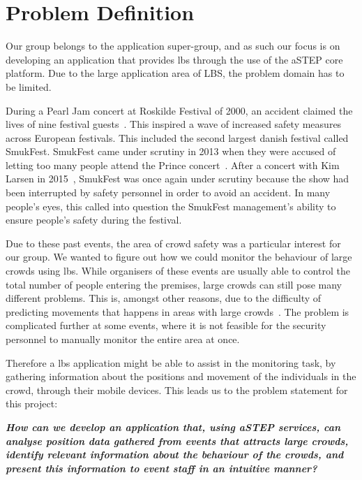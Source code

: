 \section{Problem Definition} \label{sec:problem_def}
Our group belongs to the application super-group, and as such our focus is on developing an application that provides \gls{lbs} through the use of the aSTEP core platform. Due to the large application area of LBS, the problem domain has to be limited.

During a Pearl Jam concert at Roskilde Festival of 2000, an accident claimed the lives of nine festival guests~\cite{roskilde}. This inspired a wave of increased safety measures across European festivals. This included the second largest danish festival called SmukFest. SmukFest came under scrutiny in 2013 when they were accused of letting too many people attend the Prince concert~\cite{smukfestPrince}. After a concert with Kim Larsen in 2015~\cite{kimlarsen}, SmukFest was once again under scrutiny because the show had been interrupted by safety personnel in order to avoid an accident. In many people's eyes, this called into question the SmukFest management's ability to ensure people's safety during the festival.

Due to these past events, the area of crowd safety was a particular interest for our group. We wanted to figure out how we could monitor the behaviour of large crowds using \gls{lbs}. While organisers of these events are usually able to control the total number of people entering the premises, large crowds can still pose many different problems. This is, amongst other reasons, due to the difficulty of predicting movements that happens in areas with large crowds~\cite{wirz2012inferring}. The problem is complicated further at some events, where it is not feasible for the security personnel to manually monitor the entire area at once.

Therefore a \gls{lbs} application might be able to assist in the monitoring task, by gathering information about the positions and movement of the individuals in the crowd, through their mobile devices. This leads us to the problem statement for this project:

\vspace{0.5 cm}
\begin{center}
	\textbf{\textit{How can we develop an application that, using aSTEP services, can analyse position data gathered from events that attracts large crowds, identify relevant information about the behaviour of the crowds, and present this information to event staff in an intuitive manner?}}
\end{center}